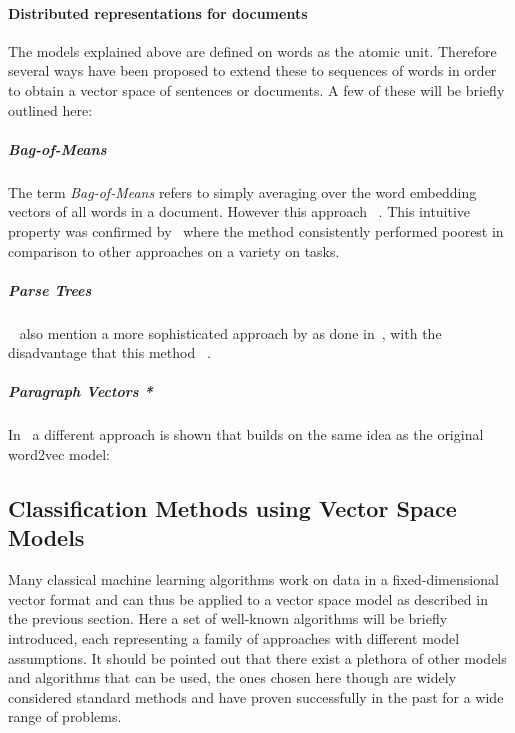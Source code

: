 \paragraph{Distributed representations for documents}
\label{par:Distributed representations for documents}

The models explained above are defined on words as the atomic unit. Therefore several ways have been proposed to extend these to sequences of words in order to obtain a vector space of sentences or documents. A few of these will be briefly outlined here:

\subparagraph{Bag-of-Means}
\label{subp:Bag-of-Means}
The term \emph{Bag-of-Means} refers to simply averaging over the word embedding vectors of all words in a document. However this approach ~\cite{Le:2014aa}. This intuitive property was confirmed by~\cite{Zhang:2015aa} where the method consistently performed poorest in comparison to other approaches on a variety on tasks.

\subparagraph{Parse Trees}~\cite{Le:2014aa} also mention a more sophisticated approach by  as done in~\cite{Socher:2011aa}, with the disadvantage that this method ~\cite{Le:2014aa}.

\subparagraph{Paragraph Vectors *}
In~\cite{Le:2014aa} a different approach is shown that builds on the same idea as the original word2vec model:

\subsection{Classification Methods using Vector Space Models}
\label{sub:Classification Methods using Vector Space Models}

Many classical machine learning algorithms work on data in a fixed-dimensional vector format and can thus be applied to a vector space model as described in the previous section. Here a set of well-known algorithms will be briefly introduced, each representing a family of approaches with different model assumptions. It should be pointed out that there exist a plethora of other models and algorithms that can be used, the ones chosen here though are widely considered standard methods and have proven successfully in the past for a wide range of problems.

